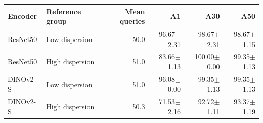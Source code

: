 \begin{tabular}{llrrrr}
\toprule
Encoder & Reference group & Mean queries & A1 & A30 & A50 \\
\midrule
ResNet50 & Low dispersion & 50.0 & 96.67$\pm$2.31 & 98.67$\pm$2.31 & 98.67$\pm$1.15 \\
ResNet50 & High dispersion & 51.0 & 83.66$\pm$1.13 & 100.00$\pm$0.00 & 99.35$\pm$1.13 \\
DINOv2-S & Low dispersion & 51.0 & 96.08$\pm$0.00 & 99.35$\pm$1.13 & 99.35$\pm$1.13 \\
DINOv2-S & High dispersion & 50.3 & 71.53$\pm$2.16 & 92.72$\pm$1.11 & 93.37$\pm$1.19 \\
\bottomrule
\end{tabular}
